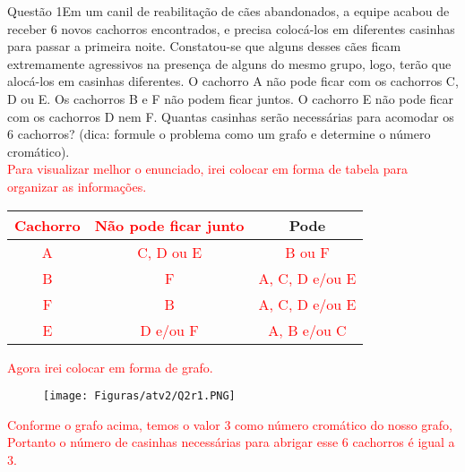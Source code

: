 \documentclass[12pt]{article}
\begin{document}
\begin{section}{Questão 1}{Em um canil de reabilitação de cães abandonados, a equipe acabou de receber 6 novos cachorros encontrados, e precisa colocá-los em diferentes casinhas para passar a primeira noite. Constatou-se que alguns
desses cães ficam extremamente agressivos na presença de alguns do mesmo grupo, logo, terão que alocá-los em casinhas diferentes. O cachorro A não pode ficar com os cachorros C, D ou E. Os cachorros B e
F não podem ficar juntos. O cachorro E não pode ficar com os cachorros D nem F. Quantas casinhas serão necessárias para acomodar os 6 cachorros? (dica: formule o problema como um grafo e determine o número cromático).}\\

\noindent \textcolor{red}{Para visualizar melhor o enunciado, irei colocar em forma de tabela para organizar as informações.}

\begin{table}[H]
\centering
\begin{tabular}{ccc}
\hline
\textcolor{red}{Cachorro} & \textcolor{red}{Não pode ficar junto} & Pode\\ \hline
\textcolor{red}{A} & \textcolor{red}{C, D ou E} & \textcolor{red}{B ou F}\\
\textcolor{red}{B} &\textcolor{red}{F} & \textcolor{red}{A, C, D e/ou E}\\
\textcolor{red}{F} &\textcolor{red}{B} & \textcolor{red}{A, C, D e/ou E}\\
\textcolor{red}{E} & \textcolor{red}{D e/ou F} & \textcolor{red}{A, B e/ou C}\\ \hline
\end{tabular}%
\end{table}

\noindent \textcolor{red}{Agora irei colocar em forma de grafo.}

\begin{figure}[H]
    \centering
    \texttt{[image: Figuras/atv2/Q2r1.PNG]}
\end{figure}

\noindent \textcolor{red}{Conforme o grafo acima, temos o valor 3 como número cromático do nosso grafo, Portanto o número de casinhas necessárias para abrigar esse 6 cachorros é igual a 3.}


\end{section}
\end{document}
